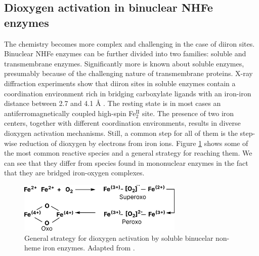 \subsection{Dioxygen activation in binuclear NHFe enzymes}
The chemistry becomes more complex and challenging in the case of diiron sites. Binuclear NHFe enzymes can be further divided into two families: soluble and transmembrane enzymes. Significantly more is known about soluble enzymes, presumably because of the challenging nature of transmembrane proteins. X-ray diffraction experiments show that diiron sites in soluble enzymes contain a coordination environment rich in bridging carboxylate ligands with an iron-iron distance between 2.7 and 4.1 Å \cite{Jasniewski2018}. The resting state is in most cases an antiferromagnetically coupled high-spin Fe$^{\mathrm{II}}_{2}$ site. The presence of two iron centers, together with different coordination environments, results in diverse dioxygen activation mechanisms. Still, a common step for all of them is the step-wise reduction of dioxygen by electrons from iron ions. Figure \ref{fig:NHFe2_strategy} shows some of the most common reactive species and a general strategy for reaching them. We can see that they differ from species found in mononuclear enzymes in the fact that they are bridged iron-oxygen complexes.

\begin{figure}[htbp]
    \centering
    \includegraphics[width=0.7\textwidth]{Figures/Dioxygen_NHFe2.pdf}
    \caption{General strategy for dioxygen activation by soluble binucelar non-heme iron enzymes. Adapted from \cite{Ray2014}.}
    \label{fig:NHFe2_strategy}
\end{figure}

